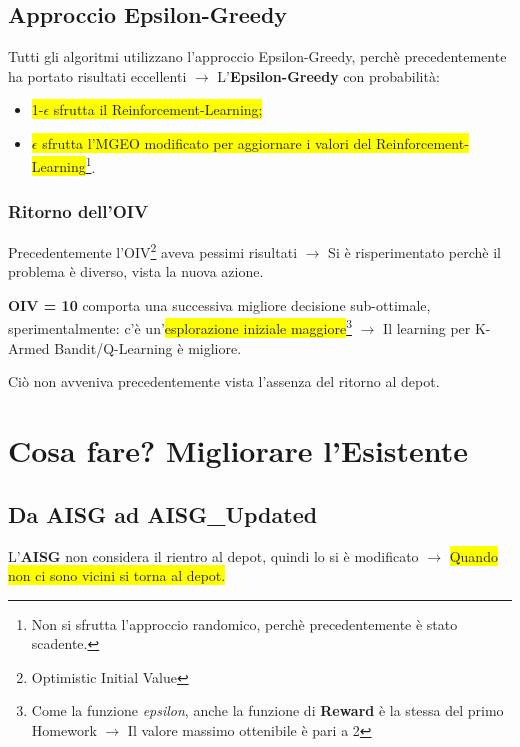 \documentclass[12pt]{article}
\begin{document}
\subsection{Approccio Epsilon-Greedy}

Tutti gli algoritmi utilizzano l'approccio Epsilon-Greedy, perchè precedentemente ha portato risultati eccellenti $\rightarrow$ L'\textbf{Epsilon-Greedy} con probabilità:

\begin{itemize}

    \item \colorbox{yellow}{1-$\epsilon$ sfrutta il Reinforcement-Learning;}
    
    \item \colorbox{yellow}{$\epsilon$ sfrutta l'MGEO modificato per aggiornare i valori del Reinforcement-Learning}\footnote{Non si sfrutta l'approccio randomico, perchè precedentemente è stato scadente.}. 
    
\end{itemize}


\subsubsection{Ritorno dell'OIV}

Precedentemente l'OIV\footnote{Optimistic Initial Value} aveva pessimi risultati $\rightarrow$ Si è risperimentato perchè il problema è diverso, vista la nuova azione.

\textbf{OIV = 10} comporta una successiva migliore decisione sub-ottimale, sperimentalmente: c'è un'\colorbox{yellow}{esplorazione iniziale maggiore}\footnote{Come la funzione \textit{epsilon}, anche la funzione di \textbf{Reward} è la stessa del primo Homework $\rightarrow$ Il valore massimo ottenibile è pari a 2} $\rightarrow$ Il learning per K-Armed Bandit/Q-Learning è migliore. 

Ciò non avveniva precedentemente vista l'assenza del ritorno al depot.

\section{Cosa fare? Migliorare l'Esistente}

\subsection{Da AISG ad AISG\_Updated}

L'\textbf{AISG} non considera il rientro al depot, quindi lo si è modificato $\rightarrow$ \colorbox{yellow}{Quando non ci sono vicini si torna al depot.}
\end{document}
